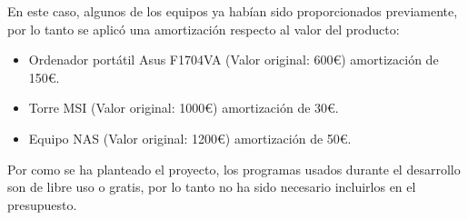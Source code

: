 En este caso, algunos de los equipos ya habían sido proporcionados previamente, por lo tanto se aplicó una amortización respecto al valor del producto:
\begin{itemize}
    \item Ordenador portátil Asus F1704VA (Valor original: 600€) amortización de 150€.
    \item Torre MSI (Valor original: 1000€) amortización de 30€.
    \item Equipo NAS (Valor original: 1200€) amortización de 50€.
\end{itemize}

Por como se ha planteado el proyecto, los programas usados durante el desarrollo son de libre uso o gratis, por lo tanto no ha sido necesario incluirlos en el presupuesto.